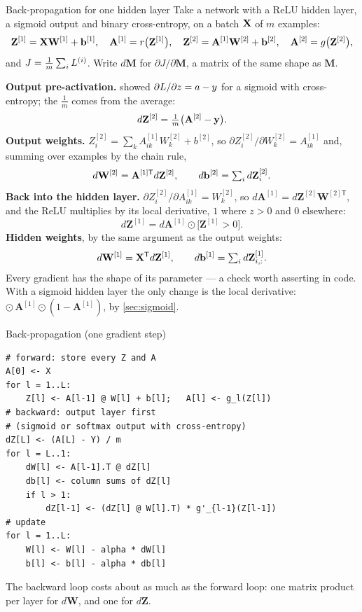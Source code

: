 \begin{derivation}{Back-propagation for one hidden layer}
Take a network with a ReLU hidden layer, a sigmoid output and binary
cross-entropy, on a batch $\mathbf{X}$ of $m$ examples:
\[
  \mathbf{Z}^{[1]} = \mathbf{X}\mathbf{W}^{[1]} + \mathbf{b}^{[1]},\quad
  \mathbf{A}^{[1]} = r\bigl(\mathbf{Z}^{[1]}\bigr),\quad
  \mathbf{Z}^{[2]} = \mathbf{A}^{[1]}\mathbf{W}^{[2]} + \mathbf{b}^{[2]},\quad
  \mathbf{A}^{[2]} = g\bigl(\mathbf{Z}^{[2]}\bigr),
\]
and $J = \frac1m\sum_iL^{(i)}$. Write $d\mathbf{M}$ for $\partial J/\partial
\mathbf{M}$, a matrix of the same shape as $\mathbf{M}$.

\textbf{Output pre-activation.}  showed
$\partial L/\partial z = a - y$ for a sigmoid with cross-entropy; the
$\frac1m$ comes from the average:
\[
  d\mathbf{Z}^{[2]} = \tfrac1m\bigl(\mathbf{A}^{[2]} - \mathbf{y}\bigr) .
\]
\textbf{Output weights.} $Z^{[2]}_{i} = \sum_k A^{[1]}_{ik}W^{[2]}_{k} + b^{[2]}$,
so $\partial Z^{[2]}_i/\partial W^{[2]}_k = A^{[1]}_{ik}$ and, summing over
examples by the chain rule,
\[
  d\mathbf{W}^{[2]} = \mathbf{A}^{[1]\mathsf{T}}d\mathbf{Z}^{[2]},\qquad
  d\mathbf{b}^{[2]} = \textstyle\sum_i d\mathbf{Z}^{[2]}_{i} .
\]
\textbf{Back into the hidden layer.} $\partial Z^{[2]}_i/\partial A^{[1]}_{ik} =
W^{[2]}_k$, so $d\mathbf{A}^{[1]} = d\mathbf{Z}^{[2]}\mathbf{W}^{[2]\mathsf{T}}$, and the
ReLU multiplies by its local derivative, $1$ where $z > 0$ and $0$ elsewhere:
\[
  d\mathbf{Z}^{[1]} = d\mathbf{A}^{[1]} \odot \bigl[\mathbf{Z}^{[1]} > 0\bigr] .
\]
\textbf{Hidden weights}, by the same argument as the output weights:
\[
  d\mathbf{W}^{[1]} = \mathbf{X}^{\mathsf{T}}d\mathbf{Z}^{[1]},\qquad
  d\mathbf{b}^{[1]} = \textstyle\sum_i d\mathbf{Z}^{[1]}_{i,:} .
\]
Every gradient has the shape of its parameter --- a check worth asserting in
code. With a sigmoid hidden layer the only change is the local derivative:
$\odot\,\mathbf{A}^{[1]}\odot(1 - \mathbf{A}^{[1]})$, by \cref{sec:sigmoid}.
\end{derivation}

\begin{algorithmbox}{Back-propagation (one gradient step)}
\begin{lstlisting}[style=pseudocode]
# forward: store every Z and A
A[0] <- X
for l = 1..L:
    Z[l] <- A[l-1] @ W[l] + b[l];   A[l] <- g_l(Z[l])
# backward: output layer first
# (sigmoid or softmax output with cross-entropy)
dZ[L] <- (A[L] - Y) / m
for l = L..1:
    dW[l] <- A[l-1].T @ dZ[l]
    db[l] <- column sums of dZ[l]
    if l > 1:
        dZ[l-1] <- (dZ[l] @ W[l].T) * g'_{l-1}(Z[l-1])
# update
for l = 1..L:
    W[l] <- W[l] - alpha * dW[l]
    b[l] <- b[l] - alpha * db[l]
\end{lstlisting}
The backward loop costs about as much as the forward loop: one matrix product per
layer for $d\mathbf{W}$, and one for $d\mathbf{Z}$.
\end{algorithmbox}

